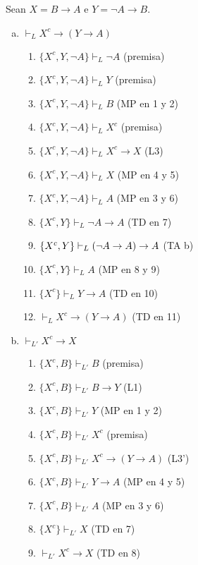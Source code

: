 \begin{solution}
Sean $X = B \to A$ e $Y = \neg A \to B$.
\begin{enumerate}[(a)]
    \item $\vdash_L X^c \to (Y \to A)$
    \leavevmode
    \begin{enumerate}[1.]
        \item $\{ X^c, Y, \neg A \} \vdash_L \neg A$    \hfill (premisa)
        \item $\{ X^c, Y, \neg A \} \vdash_L Y$         \hfill (premisa)
        \item $\{ X^c, Y, \neg A \} \vdash_L B$         \hfill (MP en 1 y 2)
        \item $\{ X^c, Y, \neg A \} \vdash_L X^c$       \hfill (premisa)
        \item $\{ X^c, Y, \neg A \} \vdash_L X^c \to X$ \hfill (L3)
        \item $\{ X^c, Y, \neg A \} \vdash_L X$         \hfill (MP en 4 y 5)
        \item $\{ X^c, Y, \neg A \} \vdash_L A$         \hfill (MP en 3 y 6)
        \item $\{ X^c, Y \} \vdash_L \neg A \to A$      \hfill (TD en 7)
        \item $\{ X^c, Y \} \vdash_L (\neg A \to A) \to A$             \hfill (TA b)
        \item $\{ X^c, Y \} \vdash_L A$                 \hfill (MP en 8 y 9)
        \item $\{ X^c \} \vdash_L Y \to A$              \hfill (TD en 10)
        \item $\vdash_L X^c \to (Y \to A)$              \hfill (TD en 11)
    \end{enumerate}
    
    \item $\vdash_{L'} X^c \to X$
    \leavevmode
    \begin{enumerate}[1.]
        \item $\{ X^c, B \} \vdash_{L'} B$                 \hfill (premisa)
        \item $\{ X^c, B \} \vdash_{L'} B \to Y$           \hfill (L1)
        \item $\{ X^c, B \} \vdash_{L'} Y$                 \hfill (MP en 1 y 2)
        \item $\{ X^c, B \} \vdash_{L'} X^c$               \hfill (premisa)
        \item $\{ X^c, B \} \vdash_{L'} X^c \to (Y \to A)$ \hfill (L3')
        \item $\{ X^c, B \} \vdash_{L'} Y \to A$           \hfill (MP en 4 y 5)
        \item $\{ X^c, B \} \vdash_{L'} A$                 \hfill (MP en 3 y 6)
        \item $\{ X^c \} \vdash_{L'} X$                    \hfill (TD en 7)
        \item $\vdash_{L'} X^c \to X$                      \hfill (TD en 8)
    \end{enumerate}
    

\end{enumerate}
\end{solution}
